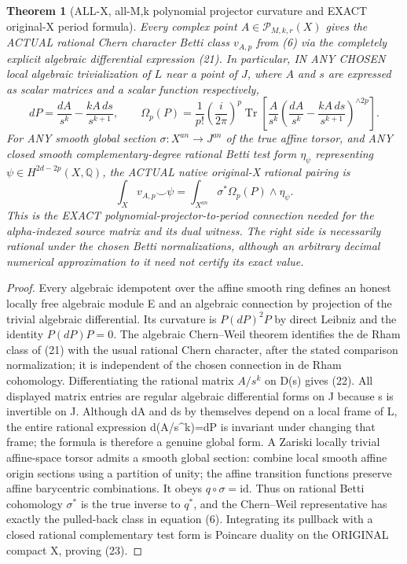\documentclass[11pt]{article}
\newtheorem{theorem}{Theorem}[section]
\begin{document}
\begin{theorem}[ALL-X, all-M,k polynomial projector curvature and EXACT original-X period formula]
Every complex point
$A\in\mathcal P_{M,k,r}(X)$
gives the ACTUAL rational
Chern character Betti class
$v_{A,p}$ from (6)
via the completely
explicit algebraic differential
expression (21).
In particular, IN ANY CHOSEN
local algebraic trivialization of
$L$ near a point of $J$,
where $A$ and $s$ are expressed
as scalar matrices and a scalar
function respectively,
\[
 \boxed{
 dP=\frac{dA}{s^k}
       -\frac{k A\,ds}{s^{k+1}},
 \qquad
 \Omega_p(P)=
 \frac1{p!}\left(\frac{i}{2\pi}\right)^p
 \operatorname{Tr}\!
 \left[
 \frac{A}{s^k}
 \left(
   \frac{dA}{s^k}
    -\frac{kA\,ds}{s^{k+1}}
 \right)^{\wedge2p}
 \right].
 }                                                     \tag{22}
\]
For ANY smooth global section
$\sigma:X^{an}\to J^{an}$
of the true affine torsor,
and ANY closed smooth
complementary-degree rational
Betti test form
$\eta_\psi$ representing
$\psi\in H^{2d-2p}(X,\mathbb Q)$,
the ACTUAL native
original-X rational pairing
is
\[
 \boxed{
 \int_Xv_{A,p}\smile\psi
  =\int_{X^{an}}
          \sigma^*\Omega_p(P)
                       \wedge\eta_\psi.
 }                                                     \tag{23}
\]
This is the EXACT
polynomial-projector-to-period
connection needed for the
alpha-indexed source matrix
and its dual witness.
The right side is necessarily
rational under the chosen
Betti normalizations,
although an arbitrary
decimal numerical
approximation to it need
not certify its exact value.
\end{theorem}
\begin{proof}
Every algebraic idempotent
over the affine smooth ring
defines an honest
locally free algebraic
module E and an algebraic
connection by projection
of the trivial algebraic
differential. Its curvature
is $P(dP)^2P$ by direct
Leibniz and the identity
$P(dP)P=0$. The algebraic
Chern--Weil theorem
identifies the de Rham
class of (21) with the
usual rational Chern
character, after the stated
comparison normalization;
it is independent of the
chosen connection in
de Rham cohomology.
Differentiating the rational
matrix $A/s^k$ on D(s)
gives (22). All displayed
matrix entries are regular
algebraic differential
forms on J because s
is invertible on J.
Although dA and ds by
themselves depend on a
local frame of L, the
entire rational expression
d(A/s^k)=dP is invariant
under changing that frame;
the formula is therefore
a genuine global form.
A Zariski locally trivial
affine-space torsor admits
a smooth global section:
combine local smooth affine
origin sections using a
partition of unity; the
affine transition functions
preserve affine barycentric
combinations. It obeys
$q\circ\sigma=\mathrm{id}$.
Thus on rational Betti
cohomology $\sigma^*$
is the true inverse to
$q^*$, and the Chern--Weil
representative has exactly
the pulled-back class
in equation (6).
Integrating its pullback
with a closed rational
complementary test form
is Poincare duality
on the ORIGINAL compact
X, proving (23).
\end{proof}
\end{document}
